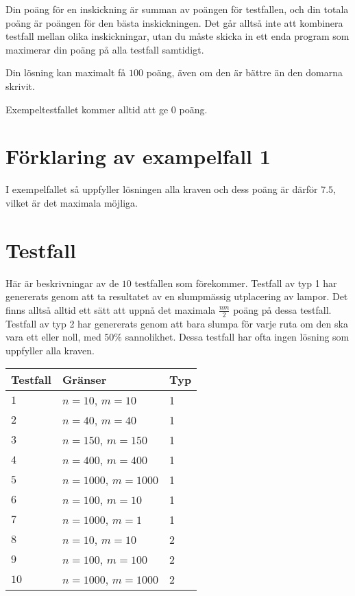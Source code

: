 Din poäng för en inskickning är summan av poängen för testfallen, och din totala poäng är poängen för den bästa inskickningen.
Det går alltså inte att kombinera testfall mellan olika inskickningar, utan du måste skicka in ett enda program som
maximerar din poäng på alla testfall samtidigt.

Din lösning kan maximalt få $100$ poäng, även om den är bättre än den domarna skrivit.

Exempeltestfallet kommer alltid att ge $0$ poäng.


\section*{Förklaring av exampelfall 1}
I exempelfallet så uppfyller lösningen alla kraven och dess poäng är därför $7.5$, vilket är det
maximala möjliga.

\section*{Testfall}
Här är beskrivningar av de $10$ testfallen som förekommer.
Testfall av typ 1 har genererats genom att ta resultatet av en slumpmässig utplacering av lampor.
Det finns alltså alltid ett sätt att uppnå det maximala $\frac{nm}{2}$ poäng på dessa testfall.
Testfall av typ 2 har genererats genom att bara slumpa för varje ruta om den ska vara ett eller noll,
med $50\%$ sannolikhet. Dessa testfall har ofta ingen lösning som uppfyller alla kraven.

\noindent
\begin{tabular}{| l | l | l |}
\hline
Testfall & Gränser                                     & Typ  \\ \hline
$1$       & $n = 10$, $m = 10$                           & 1  \\ \hline
$2$       & $n = 40$, $m = 40$                           & 1   \\ \hline
$3$       & $n = 150$, $m = 150$                           & 1   \\ \hline
$4$       & $n = 400$, $m = 400$                          & 1  \\ \hline
$5$       & $n = 1000$, $m = 1000$                          & 1   \\ \hline
$6$       & $n = 100$, $m = 10$                           & 1   \\ \hline
$7$       & $n = 1000$, $m = 1$                           & 1   \\ \hline
$8$       & $n = 10$, $m = 10$                           & 2  \\ \hline
$9$       & $n = 100$, $m = 100$                      & 2   \\ \hline
$10$      & $n = 1000$, $m = 1000$                       & 2   \\ \hline
\end{tabular}
